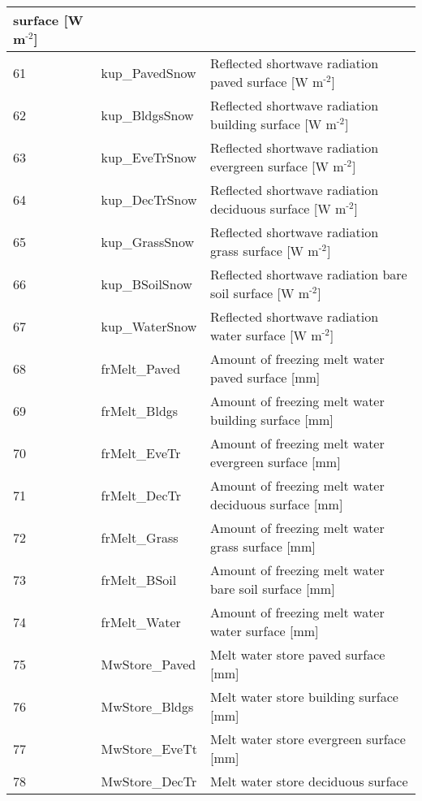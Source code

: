 \documentclass[letterpaper,10pt,english]{sphinxmanual}
\begin{document}
\begin{savenotes}
\begin{longtable}{|l|l|l|}
surface {[}W
m$^{\text{-2}}${]}
\\
\hline
61
&
kup\_PavedSnow
&
Reflected shortwave
radiation \textendash{} paved
surface {[}W
m$^{\text{-2}}${]}
\\
\hline
62
&
kup\_BldgsSnow
&
Reflected shortwave
radiation \textendash{} building
surface {[}W
m$^{\text{-2}}${]}
\\
\hline
63
&
kup\_EveTrSnow
&
Reflected shortwave
radiation \textendash{} evergreen
surface {[}W
m$^{\text{-2}}${]}
\\
\hline
64
&
kup\_DecTrSnow
&
Reflected shortwave
radiation \textendash{} deciduous
surface {[}W
m$^{\text{-2}}${]}
\\
\hline
65
&
kup\_GrassSnow
&
Reflected shortwave
radiation \textendash{} grass
surface {[}W
m$^{\text{-2}}${]}
\\
\hline
66
&
kup\_BSoilSnow
&
Reflected shortwave
radiation \textendash{} bare soil
surface {[}W
m$^{\text{-2}}${]}
\\
\hline
67
&
kup\_WaterSnow
&
Reflected shortwave
radiation \textendash{} water
surface {[}W
m$^{\text{-2}}${]}
\\
\hline
68
&
frMelt\_Paved
&
Amount of freezing
melt water \textendash{} paved
surface {[}mm{]}
\\
\hline
69
&
frMelt\_Bldgs
&
Amount of freezing
melt water \textendash{} building
surface {[}mm{]}
\\
\hline
70
&
frMelt\_EveTr
&
Amount of freezing
melt water \textendash{}
evergreen surface
{[}mm{]}
\\
\hline
71
&
frMelt\_DecTr
&
Amount of freezing
melt water \textendash{}
deciduous surface
{[}mm{]}
\\
\hline
72
&
frMelt\_Grass
&
Amount of freezing
melt water \textendash{} grass
surface {[}mm{]}
\\
\hline
73
&
frMelt\_BSoil
&
Amount of freezing
melt water \textendash{} bare
soil surface {[}mm{]}
\\
\hline
74
&
frMelt\_Water
&
Amount of freezing
melt water \textendash{} water
surface {[}mm{]}
\\
\hline
75
&
MwStore\_Paved
&
Melt water store \textendash{}
paved surface {[}mm{]}
\\
\hline
76
&
MwStore\_Bldgs
&
Melt water store \textendash{}
building surface {[}mm{]}
\\
\hline
77
&
MwStore\_EveTt
&
Melt water store \textendash{}
evergreen surface
{[}mm{]}
\\
\hline
78
&
MwStore\_DecTr
&
Melt water store \textendash{}
deciduous surface

\end{longtable}
\end{savenotes}
\end{document}
